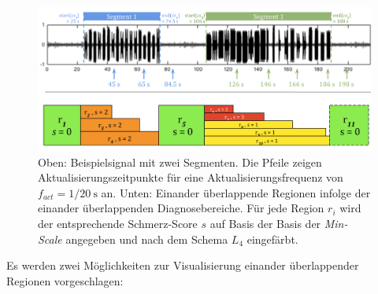 \begin{figure}[h]
	\centering
	\includegraphics[width=1\textwidth]{bilder/viz-multiple-regions.png}
	\caption[Ein Beispielsignal mit zeitlich einander überlappenden Diagnosebereichen]{Oben: Beispielsignal mit zwei Segmenten. Die Pfeile zeigen Aktualisierungszeitpunkte für eine Aktualisierungsfrequenz von $f_{act} = 1/ \SI{20}{\second}$ an. Unten: Einander überlappende Regionen infolge der einander überlappenden Diagnosebereiche. Für jede Region $r_i$ wird der entsprechende Schmerz-Score $s$ auf Basis der Basis der \emph{Min-Scale} angegeben und nach dem Schema $L_4$ eingefärbt.}
	\label{fig:viz_multiple_regions}
\end{figure}

Es werden zwei Möglichkeiten zur Visualisierung einander überlappender Regionen vorgeschlagen:

